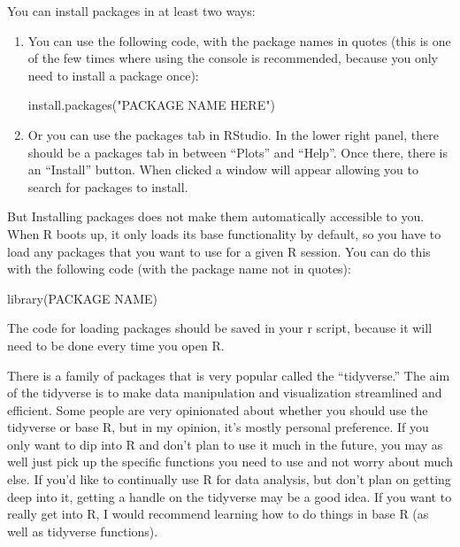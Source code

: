 \documentclass[
  letterpaper,
  DIV=11,
  numbers=noendperiod]{scrreprt}
\newenvironment{Shaded}{\begin{snugshade}}{\end{snugshade}}
\newcommand{\FunctionTok}[1]{\textcolor[rgb]{0.28,0.35,0.67}{#1}}
\newcommand{\NormalTok}[1]{\textcolor[rgb]{0.00,0.23,0.31}{#1}}
\newcommand{\StringTok}[1]{\textcolor[rgb]{0.13,0.47,0.30}{#1}}
\begin{document}
You can install packages in at least two ways:

\begin{enumerate}
\def\labelenumi{\arabic{enumi}.}
\item
  You can use the following code, with the package names in quotes (this
  is one of the few times where using the console is recommended,
  because you only need to install a package once):

\begin{Shaded}
\begin{Highlighting}[]
\FunctionTok{install.packages}\NormalTok{(}\StringTok{"PACKAGE NAME HERE"}\NormalTok{)}
\end{Highlighting}
\end{Shaded}
\item
  Or you can use the packages tab in RStudio. In the lower right panel,
  there should be a packages tab in between ``Plots'' and ``Help''. Once
  there, there is an ``Install'' button. When clicked a window will
  appear allowing you to search for packages to install.
\end{enumerate}

But Installing packages does not make them automatically accessible to
you. When R boots up, it only loads its base functionality by default,
so you have to load any packages that you want to use for a given R
session. You can do this with the following code (with the package name
not in quotes):

\begin{Shaded}
\begin{Highlighting}[]
\FunctionTok{library}\NormalTok{(PACKAGE NAME)}
\end{Highlighting}
\end{Shaded}

The code for loading packages should be saved in your r script, because
it will need to be done every time you open R.

There is a family of packages that is very popular called the
``tidyverse.'' The aim of the tidyverse is to make data manipulation and
visualization streamlined and efficient. Some people are very
opinionated about whether you should use the tidyverse or base R, but in
my opinion, it's mostly personal preference. If you only want to dip
into R and don't plan to use it much in the future, you may as well just
pick up the specific functions you need to use and not worry about much
else. If you'd like to continually use R for data analysis, but don't
plan on getting deep into it, getting a handle on the tidyverse may be a
good idea. If you want to really get into R, I would recommend learning
how to do things in base R (as well as tidyverse functions).
\end{document}

